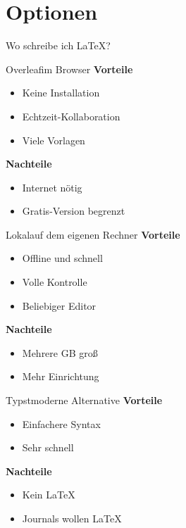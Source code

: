\section{Optionen}

\begin{frame}{Wo schreibe ich \LaTeX?}
  \small
  \begin{tcbraster}[raster columns=3, raster equal height, raster column skip=10pt]
    \begin{karte}{Overleaf}{im Browser}
      \textbf{Vorteile}
      \begin{itemize}
        \item Keine Installation
        \item Echtzeit-Kollaboration
        \item Viele Vorlagen
      \end{itemize}
      \textbf{Nachteile}
      \begin{itemize}
        \item Internet nötig
        \item Gratis-Version begrenzt
      \end{itemize}
    \end{karte}
    \begin{karte}{Lokal}{auf dem eigenen Rechner}
      \textbf{Vorteile}
      \begin{itemize}
        \item Offline und schnell
        \item Volle Kontrolle
        \item Beliebiger Editor
      \end{itemize}
      \textbf{Nachteile}
      \begin{itemize}
        \item Mehrere GB groß
        \item Mehr Einrichtung
      \end{itemize}
    \end{karte}
    \begin{karte}{Typst}{moderne Alternative}
      \textbf{Vorteile}
      \begin{itemize}
        \item Einfachere Syntax
        \item Sehr schnell
      \end{itemize}
      \textbf{Nachteile}
      \begin{itemize}
        \item Kein \LaTeX
        \item Journals wollen \LaTeX
      \end{itemize}
    \end{karte}
  \end{tcbraster}
\end{frame}

